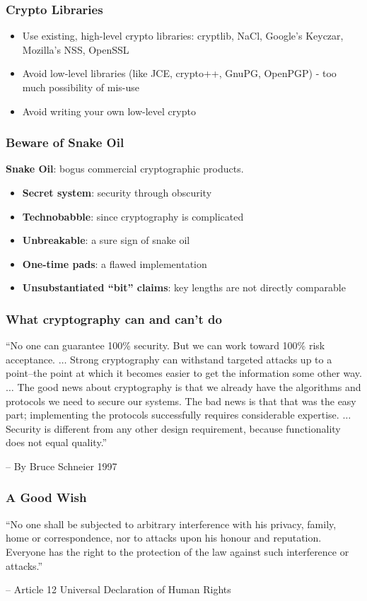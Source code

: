 \begin{frame}\frametitle{Crypto Libraries}
\begin{itemize}
\item Use existing, high-level crypto libraries: 
cryptlib, NaCl, Google's Keyczar, Mozilla's NSS, OpenSSL 
\item Avoid low-level libraries (like JCE, crypto++, GnuPG, OpenPGP) - too much possibility of mis-use
\item Avoid writing your own low-level crypto
\end{itemize}
\end{frame}
\begin{frame}\frametitle{Beware of Snake Oil}
\textbf{Snake Oil}: bogus commercial cryptographic products.
\begin{itemize}
\item \textbf{Secret system}: security through obscurity
\item \textbf{Technobabble}: since cryptography is complicated
\item \textbf{Unbreakable}: a sure sign of snake oil
\item \textbf{One-time pads}: a flawed implementation
\item \textbf{Unsubstantiated ``bit'' claims}: key lengths are not directly comparable
\end{itemize}
\end{frame}
\begin{frame}\frametitle{What cryptography can and can't do}
``No one can guarantee 100\% security. But we can work toward 100\% risk acceptance. $\dots$ Strong cryptography can withstand targeted attacks up to a point--the point at which it becomes easier to get the information some other way. $\dots$ The good news about cryptography is that we already have the algorithms and protocols we need to secure our systems. The bad news is that that was the easy part; implementing the protocols successfully requires considerable expertise. $\dots$  
Security is different from any other design requirement, because functionality does not equal quality.''
\newline

-- By Bruce Schneier 1997
\end{frame}
\begin{frame}\frametitle{A Good Wish}
``No one shall be subjected to arbitrary interference with his privacy, family, home or correspondence, nor to attacks upon his honour and reputation. Everyone has the right to the protection of the law against such interference or attacks.''
\newline

-- Article 12 Universal Declaration of Human Rights
\end{frame}


